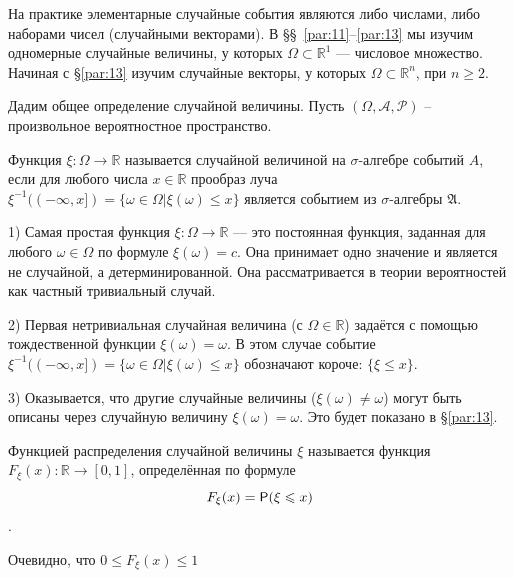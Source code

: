 На практике элементарные случайные события являются либо числами, либо наборами чисел (случайными векторами). В \S\S\ \ref{par:11}–\ref{par:13} мы изучим
одномерные случайные величины, у которых $\Omega\subset\mathbb{R}^1$ — числовое множество. Начиная с \S\ref{par:13} изучим случайные векторы, у которых  
$\Omega\subset\mathbb{R}^n$, при $n \geqslant 2$.

Дадим общее определение случайной величины. Пусть $(\Omega, \mathcal{A}, \mathcal{P})$ -- произвольное вероятностное пространство.

\begin{definition}
\label{def:11.1}
	Функция $\xi : \Omega \rightarrow \mathbb{R}$ называется случайной величиной на $\sigma$-алгебре событий $A$, если для любого числа $x\in\mathbb{R}$ прообраз луча
	$\xi^{-1}((-\infty,x])=\{\omega\in\Omega|\xi(\omega)\leqslant x\}$
	 является событием из $\sigma$-алгебры $\mathfrak{A}$.
\end{definition}

\begin{zam}
\label{zam:11.2}
	
1) Самая простая функция $\xi : \Omega \rightarrow \mathbb{R}$ — это постоянная функция, заданная для любого $\omega \in \Omega$ по формуле $\xi(\omega)=c$. Она
принимает одно значение и является не случайной, а детерминированной.
Она рассматривается в теории вероятностей как частный тривиальный
случай.

2) Первая нетривиальная случайная величина (с $\Omega \in \mathbb{R}$) задаётся
с помощью тождественной функции $\xi(\omega) = \omega$. В этом случае событие
$\xi^{-1}((-\infty,x])=\{\omega\in\Omega|\xi(\omega)\leqslant x\}$ обозначают короче: $\{\xi \leqslant x\}$.

3) Оказывается, что другие случайные величины ($\xi(\omega) \neq \omega$) могут быть
описаны через случайную величину $\xi(\omega) = \omega$. Это будет показано в \S\ref{par:13}.
\end{zam}

\begin{definition}
\label{def:11.3}
	Функцией распределения случайной величины $\xi$ называется функция $F_{\xi}(x) : \mathbb{R} \rightarrow [0, 1]$, определённая по формуле
$$F_{\xi}(x)=\P(\xi\leqslant x)$$.
\end{definition}

Очевидно, что $0\leqslant F_{\xi}(x)\leqslant 1$

